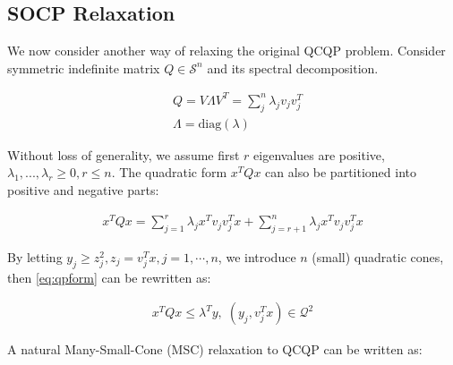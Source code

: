 \documentclass[../main]{subfiles}
\begin{document}
\subsection{SOCP Relaxation}

We now consider another way of relaxing the original QCQP problem. Consider symmetric indefinite matrix \(Q \in \mathcal{S}^n\) and its spectral decomposition.

\begin{equation}
  \begin{aligned}
     & Q = V\Lambda V ^T =\sum_j^n \lambda_j v_j  v_j^T \\
     & \Lambda = \mathrm{diag}(\lambda)
  \end{aligned}
\end{equation}

Without loss of generality, we assume first \(r\) eigenvalues are positive, \(\lambda_1, ..., \lambda_r \ge 0, r\le n \). The quadratic form \(x^TQx\) can also be partitioned into positive and negative parts:

\begin{equation}\label{eq:qpform}
  \begin{aligned}
    x^TQx = \sum_{j=1}^r \lambda_j x^T v_j v_j^T x + \sum_{j=r+1}^n \lambda_j x^T v_j v_j^T x
  \end{aligned}
\end{equation}

By letting \(y_j \ge z_j^2, z_j = v_j^T x, j = 1, \cdots, n\), we introduce \(n\) (small) quadratic cones, then \eqref{eq:qpform} can be rewritten as:

\begin{equation}
  \begin{aligned}
    x^TQx \le \lambda^Ty,\; (y_j, v^T_j x) \in \mathcal{Q}^2
  \end{aligned}
\end{equation}

A natural Many-Small-Cone (MSC) relaxation to  QCQP can be written as:
\end{document}
